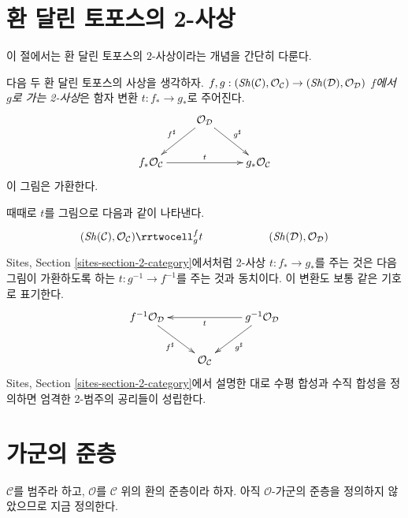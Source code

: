 \section{환 달린 토포스의 2-사상}
\label{section-2-category}

\noindent
이 절에서는 환 달린 토포스의 $2$-사상이라는 개념을 간단히 다룬다.

\begin{definition}
\label{definition-2-morphism-ringed-topoi}
다음 두 환 달린 토포스의 사상을 생각하자.
$f, g :
(\mathop{\mathit{Sh}}\nolimits(\mathcal{C}), \mathcal{O}_\mathcal{C})
\to
(\mathop{\mathit{Sh}}\nolimits(\mathcal{D}), \mathcal{O}_\mathcal{D})$
{\it $f$에서 $g$로 가는 2-사상}은 함자 변환
$t : f_* \to g_*$로 주어진다.
$$
\xymatrix{
& \mathcal{O}_\mathcal{D}
\ar[ld]_{f^\sharp}
\ar[rd]^{g^\sharp} \\
f_*\mathcal{O}_\mathcal{C} \ar[rr]^t & &
g_*\mathcal{O}_\mathcal{C}
}
$$
이 그림은 가환한다.
\end{definition}

\noindent
때때로 $t$를 그림으로 다음과 같이 나타낸다.
$$
\xymatrix{
(\Sh(\mathcal{C}), \mathcal{O}_\mathcal{C})
\rrtwocell^f_g{t}
&
&
(\Sh(\mathcal{D}), \mathcal{O}_\mathcal{D})
}
$$
Sites, Section \ref{sites-section-2-category}에서처럼 2-사상
$t : f_* \to g_*$를 주는 것은 다음 그림이 가환하도록 하는
$t : g^{-1} \to f^{-1}$를 주는 것과 동치이다. 이 변환도 보통 같은 기호로
표기한다.
$$
\xymatrix{
f^{-1}\mathcal{O}_\mathcal{D}
\ar[rd]_{f^\sharp}  & &
g^{-1}\mathcal{O}_\mathcal{D} \ar[ll]^t \ar[ld]^{g^\sharp} \\
& \mathcal{O}_\mathcal{C}
}
$$
Sites, Section \ref{sites-section-2-category}에서 설명한 대로 수평 합성과
수직 합성을 정의하면 엄격한 2-범주의 공리들이 성립한다.










\section{가군의 준층}
\label{section-presheaves-modules}

\noindent
$\mathcal{C}$를 범주라 하고, $\mathcal{O}$를 $\mathcal{C}$ 위의 환의
준층이라 하자. 아직 $\mathcal{O}$-가군의 준층을 정의하지 않았으므로
지금 정의한다.

